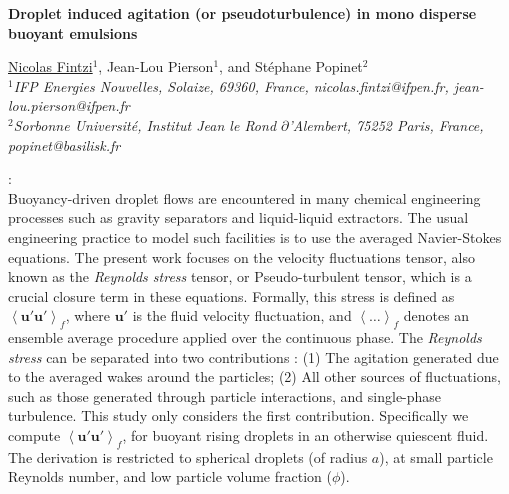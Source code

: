 \documentclass[12pt,a4paper]{article}
\newcommand{\avg}[1]{\left<#1\right>}
\renewcommand{\avg}[1]{\left<#1\right>}
\begin{document}
\pagestyle{fancy}
\fancyhf{}

\lhead{\textcolor{mygray}{12th International Conference on Multiphase flow}}
\rhead{\textcolor{mygray}{ICMF 2025, Toulouse, France, May 12-16, 2025}}
\lfoot{}
\cfoot{}
\rfoot{}

\begin{center}
{\large {\bf Droplet induced agitation (or pseudoturbulence) in mono disperse buoyant emulsions}}
\vspace{10pt}


\underline{Nicolas Fintzi}$^1$, Jean-Lou Pierson$^1$, and St\'ephane Popinet$^2$\\
{\it
$^1$IFP Energies Nouvelles, Solaize, 69360, France, nicolas.fintzi@ifpen.fr, jean-lou.pierson@ifpen.fr\\
$^2$Sorbonne Universit\'e, Institut Jean le Rond $\partial$'Alembert, 75252 Paris, France, popinet@basilisk.fr\\
}
\end{center}

\vspace{10pt}
:\\
Buoyancy-driven droplet flows are encountered in many chemical engineering processes such as gravity separators and liquid-liquid extractors. 
The usual engineering practice to model such facilities is to use the averaged Navier-Stokes equations. 
The present work focuses on the velocity fluctuations tensor, also known as the \textit{Reynolds stress} tensor, or Pseudo-turbulent tensor, which is a crucial closure term in these equations.
Formally, this stress is defined as $\avg{ \textbf{u}' \textbf{u}'}_f$, where $\textbf{u}'$ is the fluid velocity fluctuation, and $\avg{\ldots}_f$ denotes an ensemble average procedure applied over the continuous phase. 
The \textit{Reynolds stress} can be separated into two contributions : (1) The agitation generated due to the averaged wakes around the particles; (2) All other sources of fluctuations, such as those generated through particle interactions, and single-phase turbulence. %
This study only considers the first contribution. 
Specifically we compute $\avg{ \textbf{u}' \textbf{u}'}_f$, for buoyant rising droplets in an otherwise quiescent fluid. 
The derivation is restricted to spherical droplets (of radius $a$), at small particle Reynolds number, and low particle volume fraction ($\phi$). 
    \vspace{10pt}
\end{document}
